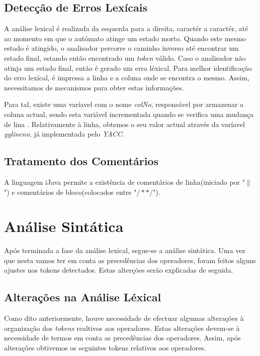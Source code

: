 \documentclass[11pt,a4paper]{article}
\begin{document}
\subsection{Detecção de Erros Lexícais}

A análise lexical é realizada da esquerda para a direita, caractér a caractér, até ao momento em que o autómato atinge um estado morto. Quando este mesmo estado é atingido, o analisador percorre o caminho inverso até encontrar um estado final, estando então encontrado um \emph{token} válido. Caso o analisador não atinja um estado final, então é gerado um erro léxical. Para melhor identificação do erro lexícal, é impressa a linha e a coluna onde se encontra o mesmo. Assim, necessitamos de mecanismos para obter estas informações.

Para tal, existe uma varíavel com o nome \emph{colNo}, responsável por armazenar a coluna actual, sendo esta variável incrementada quando se verifica uma mudança de lina . Relativamente à linha, obtemos o seu valor actual através da varíavel \emph{yylineno}, já implementada pelo \emph{YACC}.



\subsection{Tratamento dos Comentários}

A linguagem iJava permite a existência de comentários de linha(iniciado por "$\|$") e comentários de bloco(colocados entre "$/* */$").

\newpage

\section{Análise Sintática}

Após terminada a fase da análise lexical, segue-se a análise sintática. Uma vez que nesta vamos ter em conta as precedências dos operadores, foram feitos alguns ajustes nos tokens detectados. Estas alterções serão explicadas de seguida.

\subsection{Alterações na Análise Léxical}

Como dito anteriormente, houve necessidade de efectuar algumas alterações à organização dos \emph{tokens} realtivos aos operadores. Estas alterações devem-se à necessidade de termos em conta as precedências dos operadores. Assim, após alterações obtivemos os seguintes tokens relativos aos operadores.
\end{document}
